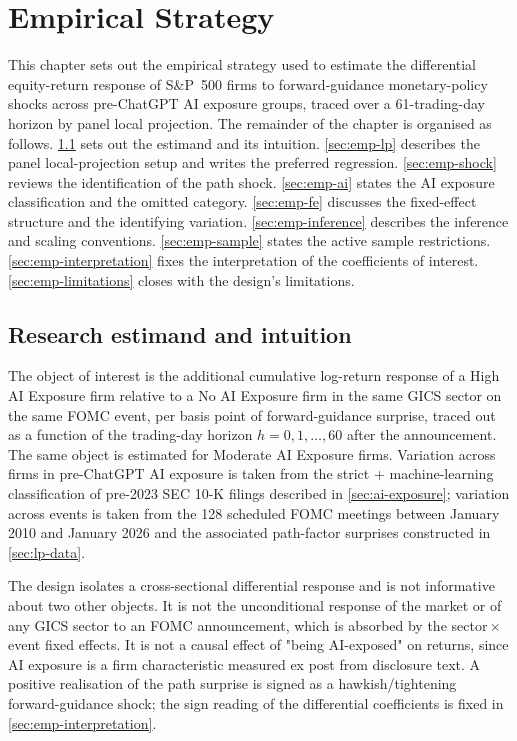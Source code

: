 \chapter{Empirical Strategy}
\label{ch:empirical_strategy}

This chapter sets out the empirical strategy used to estimate the differential equity-return response of S\&P~500 firms to forward-guidance monetary-policy shocks across pre-ChatGPT AI exposure groups, traced over a 61-trading-day horizon by panel local projection. The remainder of the chapter is organised as follows. \cref{sec:emp-estimand} sets out the estimand and its intuition. \cref{sec:emp-lp} describes the panel local-projection setup and writes the preferred regression. \cref{sec:emp-shock} reviews the identification of the path shock. \cref{sec:emp-ai} states the AI exposure classification and the omitted category. \cref{sec:emp-fe} discusses the fixed-effect structure and the identifying variation. \cref{sec:emp-inference} describes the inference and scaling conventions. \cref{sec:emp-sample} states the active sample restrictions. \cref{sec:emp-interpretation} fixes the interpretation of the coefficients of interest. \cref{sec:emp-limitations} closes with the design's limitations.

\section{Research estimand and intuition}
\label{sec:emp-estimand}

The object of interest is the additional cumulative log-return response of a High AI Exposure firm relative to a No AI Exposure firm in the same GICS sector on the same FOMC event, per basis point of forward-guidance surprise, traced out as a function of the trading-day horizon $h = 0, 1, \dots, 60$ after the announcement. The same object is estimated for Moderate AI Exposure firms. Variation across firms in pre-ChatGPT AI exposure is taken from the strict + machine-learning classification of pre-2023 SEC 10-K filings described in \cref{sec:ai-exposure}; variation across events is taken from the 128 scheduled FOMC meetings between January 2010 and January 2026 and the associated path-factor surprises constructed in \cref{sec:lp-data}.

The design isolates a cross-sectional differential response and is not informative about two other objects. It is not the unconditional response of the market or of any GICS sector to an FOMC announcement, which is absorbed by the sector\,$\times$\,event fixed effects. It is not a causal effect of "being AI-exposed" on returns, since AI exposure is a firm characteristic measured ex post from disclosure text. A positive realisation of the path surprise is signed as a hawkish/tightening forward-guidance shock; the sign reading of the differential coefficients is fixed in \cref{sec:emp-interpretation}.

